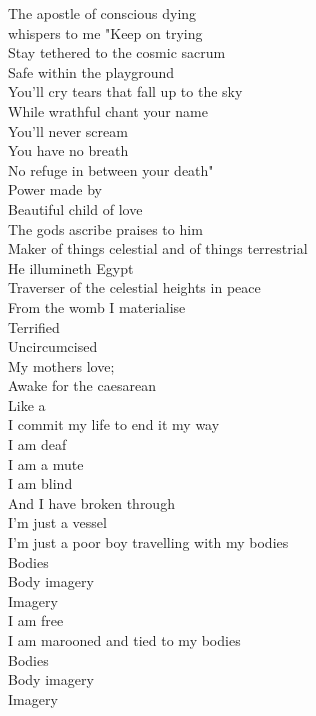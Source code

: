 
The apostle of conscious dying \\
whispers to me "Keep on trying \\
Stay tethered to the cosmic sacrum \\
Safe within the  playground \\
You'll cry tears that fall up to the sky \\
While wrathful  chant your name \\
You'll never scream \\
You have no breath \\
No refuge in between your death" \\

Power made by  \\
Beautiful child of love \\
The gods ascribe praises to him \\
Maker of things celestial and of things terrestrial \\
He illumineth Egypt \\
Traverser of the celestial heights in peace \\

From the womb I materialise \\
Terrified \\
Uncircumcised \\
My mothers love;  \\
Awake for the caesarean \\
Like a  \\
I commit my life to end it my way \\
I am deaf \\
I am a mute \\
I am blind \\
And I have broken through \\

I'm just a vessel \\
I'm just a poor boy travelling with my bodies \\
Bodies \\
Body imagery \\
Imagery \\
I am free \\
I am marooned and tied to my bodies \\
Bodies \\
Body imagery \\
Imagery \\

